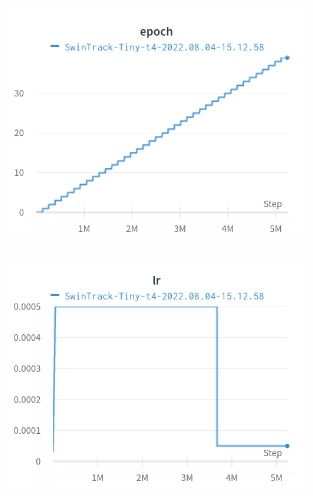  \begin{figure}[H]
 	\centerline{\includegraphics[width=0.7\textwidth]{charts/Section-2-Panel-6-m8q6253z0}}
 	\caption{
 		}
 \end{figure}
 
  \begin{figure}[H]
 	\centerline{\includegraphics[width=0.7\textwidth]{charts/Section-2-Panel-12-bzoemlec5}}
 	\caption{
 		}
 \end{figure}


%	

